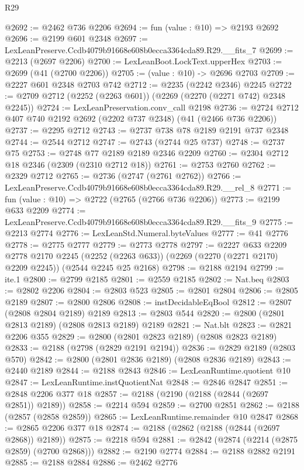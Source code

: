 \begin{lexlean}{R29}
\begin{coremodule}
@2692 := @2462 @736 @2206
@2694 := fun (value : @10) => @2193 @2692
@2696 := @2199 @601 @2348
@2697 := LexLeanPreserve.Ccdb4079b91668e608b0ecca3364cda89.R29.__fits_7
@2699 := @2213 (@2697 @2206)
@2700 := LexLeanBoot.LockText.upperHex
@2703 := @2699 (@41 (@2700 @2206))
@2705 := (value : @10) -> @2696 @2703
@2709 := @2227 @601 @2348 @2703 @742
@2712 := @2235 (@2242 @2346) @2245
@2722 := @2709 @2712 (@2252 (@2263 @601)) (@2269 (@2270 (@2271 @742) @2348 @2245))
@2724 := LexLeanPreservation.conv_call @2198
@2736 := @2724 @2712 @407 @740 @2192 @2692 (@2202 @737 @2348) (@41 (@2466 @736 @2206))
@2737 := @2295 @2712
@2743 := @2737 @738 @78 @2189 @2191 @737 @2348
@2744 := @2544 @2712
@2747 := @2743 (@2744 @25 @737)
@2748 := @2737 @75
@2753 := @2748 @77 @2189 @2189 @2346 @2209
@2760 := @2304 @2712 @18 @2346 (@2309 (@2310 @2712 @18))
@2761 := @2753 @2760
@2762 := @2329 @2712
@2765 := @2736 (@2747 (@2761 @2762))
@2766 := LexLeanPreserve.Ccdb4079b91668e608b0ecca3364cda89.R29.__rel_8
@2771 := fun (value : @10) => @2722 (@2765 (@2766 @736 @2206))
@2773 := @2199 @633 @2209
@2774 := LexLeanPreserve.Ccdb4079b91668e608b0ecca3364cda89.R29.__fits_9
@2775 := @2213 @2774
@2776 := LexLeanStd.Numeral.byteValues
@2777 := @41 @2776
@2778 := @2775 @2777
@2779 := @2773 @2778
@2797 := @2227
    @633
    @2209
    @2778
    @2170
    @2245
    (@2252 (@2263 @633))
    (@2269 (@2270 (@2271 @2170) @2209 @2245))
    (@2544 @2245 @25 @2168)
@2798 := @2188 @2194
@2799 := ite.{1}
@2800 := @2799 @2185
@2801 := @2559 @2185
@2802 := Nat.beq
@2803 := @2802 @2206
@2804 := @2803 @523
@2805 := @2801 @2804
@2806 := @2805 @2189
@2807 := @2800 @2806
@2808 := instDecidableEqBool
@2812 := @2807 (@2808 @2804 @2189) @2189
@2813 := @2803 @544
@2820 := @2800 (@2801 @2813 @2189) (@2808 @2813 @2189) @2189
@2821 := Nat.blt
@2823 := @2821 @2206 @355
@2829 := @2800 (@2801 @2823 @2189) (@2808 @2823 @2189)
@2833 := @2188 (@2798 (@2829 @2191 @2194))
@2836 := @2829 @2189 (@2803 @570)
@2842 := @2800 (@2801 @2836 @2189) (@2808 @2836 @2189)
@2843 := @2440 @2189
@2844 := @2188 @2843
@2846 := LexLeanRuntime.quotient @10
@2847 := LexLeanRuntime.instQuotientNat
@2848 := @2846 @2847
@2851 := @2848 @2206 @377 @18
@2857 := @2188 (@2190 (@2188 (@2844 (@2697 @2851)) @2189))
@2858 := @2214 @594
@2859 := @2700 @2851
@2862 := @2188 (@2857 (@2858 @2859))
@2865 := LexLeanRuntime.remainder @10 @2847
@2868 := @2865 @2206 @377 @18
@2874 := @2188 (@2862 (@2188 (@2844 (@2697 @2868)) @2189))
@2875 := @2218 @594
@2881 := @2842 (@2874 (@2214 (@2875 @2859) (@2700 @2868)))
@2882 := @2190 @2774
@2884 := @2188 @2882 @2191
@2885 := @2188 @2884
@2886 := @2462 @2776

\end{coremodule}
\end{lexlean}

